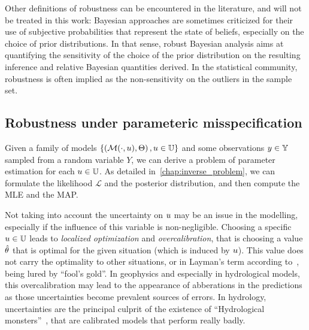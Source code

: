 \documentclass[../../Main_ManuscritThese.tex]{subfiles}
\begin{document}
Other definitions of robustness can be encountered in the literature, and will not be treated in this work: Bayesian approaches are sometimes criticized for their use of subjective probabilities that represent the state of beliefs, especially on the choice of prior distributions. In that sense, robust Bayesian analysis aims at quantifying the sensitivity of the choice of the prior distribution on the resulting inference and relative Bayesian quantities derived. In the statistical community, robustness is often implied as the non-sensitivity on the outliers in the sample set.



\subsection{Robustness under parameteric misspecification}

Given a family of models $\left\{\left(\mathcal{M}(\cdot, u), \Theta\right), u\in\mathbb{U}\right\}$ and some observations $y\in \mathbb{Y}$ sampled from a random variable $Y$, we can derive a problem of parameter estimation for each $u \in \mathbb{U}$. As detailed in~\cref{chap:inverse_problem}, we can formulate the likelihood $\mathcal{L}$ and the posterior distribution, and then compute the MLE and the MAP.\@



Not taking into account the uncertainty on $u$ may be an issue in the modelling, especially if the influence of this variable is non-negligible.
Choosing a specific $u \in \mathbb{U}$ leads to \emph{localized optimization} \citep{huyse_free-form_2001} and \emph{overcalibration}, that is choosing a value $\hat{\theta}$ that is optimal for the given situation (which is induced by $u$). This value does not carry the optimality to other situations, or in Layman's term according to~\cite{andreassian_all_2012}, being lured by ``fool's gold''.
In geophysics and especially in hydrological models, this overcalibration may lead to the appearance of abberations in the predictions as those uncertainties become prevalent sources of errors. In hydrology, uncertainties are the principal culprit of the existence of  ``Hydrological monsters''~\citep{kuczera_there_2010}, that are calibrated models that perform really badly.
\end{document}
